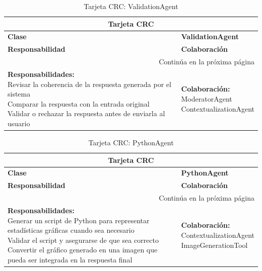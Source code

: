 \begin{longtable}{|l|l|}
	\caption{Tarjeta CRC: ValidationAgent} \label{tablacrc4} \\
	
	\hline
	\multicolumn{2}{|c|}{\textbf{Tarjeta CRC}} \\
	\hline
	\textbf{Clase} & \textbf{ValidationAgent} \\
	\hline
	\endfirsthead
	
	\hline
	\textbf{Responsabilidad} & \textbf{Colaboración} \\
	\hline
	\endhead
	
	\hline
	\multicolumn{2}{|r|}{Continúa en la próxima página} \\
	\hline
	\endfoot
	
	\hline
	\endlastfoot
	
	\parbox[t]{0.45\linewidth}{\textbf{Responsabilidades:} \\ 
		Revisar la coherencia de la respuesta generada por el sistema \\ 
		Comparar la respuesta con la entrada original \\ 
		Validar o rechazar la respuesta antes de enviarla al usuario} 
	& 
	\parbox[t]{0.45\linewidth}{\textbf{Colaboración:} \\
		ModeratorAgent \\ 
		ContextualizationAgent}
\end{longtable}

\begin{longtable}{|l|l|}
	\caption{Tarjeta CRC: PythonAgent} \label{tablacrc5} \\
	
	\hline
	\multicolumn{2}{|c|}{\textbf{Tarjeta CRC}} \\
	\hline
	\textbf{Clase} & \textbf{PythonAgent} \\
	\hline
	\endfirsthead
	
	\hline
	\textbf{Responsabilidad} & \textbf{Colaboración} \\
	\hline
	\endhead
	
	\hline
	\multicolumn{2}{|r|}{Continúa en la próxima página} \\
	\hline
	\endfoot
	
	\hline
	\endlastfoot
	
	\parbox[t]{0.45\linewidth}{\textbf{Responsabilidades:} \\ 
		Generar un script de Python para representar estadísticas gráficas cuando sea necesario \\ 
		Validar el script y asegurarse de que sea correcto \\ 
		Convertir el gráfico generado en una imagen que pueda ser integrada en la respuesta final} 
	& 
	\parbox[t]{0.45\linewidth}{\textbf{Colaboración:} \\
		ContextualizationAgent \\ 
		ImageGenerationTool}
\end{longtable}







